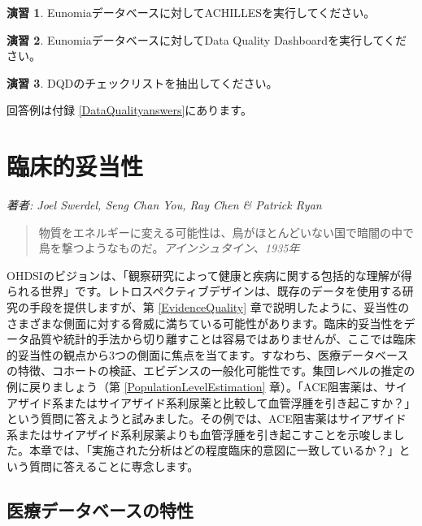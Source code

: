\documentclass[
  11pt]{book}
\theoremstyle{definition}
\theoremstyle{definition}
\theoremstyle{definition}
\newtheorem{exercise}{演習}[chapter]
\theoremstyle{definition}
\theoremstyle{remark}
\begin{document}
\begin{exercise}
\protect\hypertarget{exr:exerciseRunAchilles}{}\label{exr:exerciseRunAchilles}Eunomiaデータベースに対してACHILLESを実行してください。
\end{exercise}

\begin{exercise}
\protect\hypertarget{exr:exerciseRunDQD}{}\label{exr:exerciseRunDQD}Eunomiaデータベースに対してData Quality Dashboardを実行してください。
\end{exercise}

\begin{exercise}
\protect\hypertarget{exr:exerciseViewDQD}{}\label{exr:exerciseViewDQD}DQDのチェックリストを抽出してください。
\end{exercise}

回答例は付録 \ref{DataQualityanswers}にあります。

\chapter{臨床的妥当性}\label{ClinicalValidity}

\emph{著者: Joel Swerdel, Seng Chan You, Ray Chen \& Patrick Ryan}

\begin{quote}
物質をエネルギーに変える可能性は、鳥がほとんどいない国で暗闇の中で鳥を撃つようなものだ。\emph{アインシュタイン、1935年}
\end{quote}

OHDSIのビジョンは、「観察研究によって健康と疾病に関する包括的な理解が得られる世界」です。レトロスペクティブデザインは、既存のデータを使用する研究の手段を提供しますが、第 \ref{EvidenceQuality} 章で説明したように、妥当性のさまざまな側面に対する脅威に満ちている可能性があります。臨床的妥当性をデータ品質や統計的手法から切り離すことは容易ではありませんが、ここでは臨床的妥当性の観点から3つの側面に焦点を当てます。すなわち、医療データベースの特徴、コホートの検証、エビデンスの一般化可能性です。集団レベルの推定の例に戻りましょう（第 \ref{PopulationLevelEstimation} 章）。「ACE阻害薬は、サイアザイド系またはサイアザイド系利尿薬と比較して血管浮腫を引き起こすか？」という質問に答えようと試みました。その例では、ACE阻害薬はサイアザイド系またはサイアザイド系利尿薬よりも血管浮腫を引き起こすことを示唆しました。本章では、「実施された分析はどの程度臨床的意図に一致しているか？」という質問に答えることに専念します。

\section{医療データベースの特性}\label{CharacteristicsOfDatabase}
\end{document}
